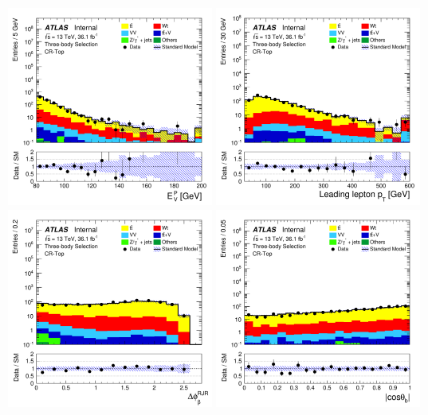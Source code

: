 \begin{figure}[!htb]
    \begin{center}
        \includegraphics[width=0.48\textwidth]{figures/search_stop2l/bkg_est/crtop/crt_MDR}
        \includegraphics[width=0.48\textwidth]{figures/search_stop2l/bkg_est/crtop/crt_l_pt0}
        \includegraphics[width=0.48\textwidth]{figures/search_stop2l/bkg_est/crtop/crt_DPB_vSS}
        \includegraphics[width=0.48\textwidth]{figures/search_stop2l/bkg_est/crtop/crt_cosThetaB}

\end{center}
\end{figure}
